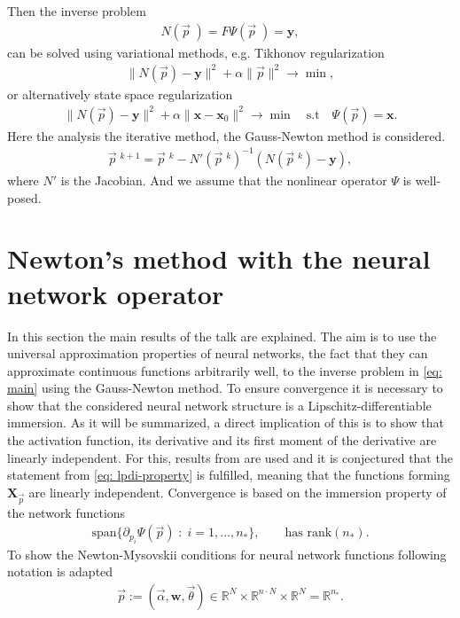 Then the inverse problem
\begin{align}
    N(\vec{p}\;) = F\Psi(\vec{p}\;) = \mathbf{y},
\end{align}
can be solved using variational methods, e.g. Tikhonov regularization
\begin{align}
    \|N(\vec{p}) - \mathbf{y}\|^{2} + \alpha \|\vec{p}\|^{2} \to \min,
\end{align}
or alternatively state space regularization
\begin{align}
    \|N(\vec{p}) - \mathbf{y}\|^{2}
    + \alpha \|\mathbf{x} - \mathbf{x}_0\|^{2}
    \to \min \quad \text{s.t} \quad \Psi(\vec{p}) = \mathbf{x}.
\end{align}
Here the analysis the iterative method, the Gauss-Newton method is
considered.
\begin{align}
    \vec{p}\;^{k+1} = \vec{p}\;^{k} -
    N'( \vec{p}\;^{k})^{-1} (N(\vec{p}\;^{k}) -
    \mathbf{y}  ),
\end{align}
where $N'$ is the Jacobian. And we assume that the nonlinear operator $\Psi$ is well-posed.


\section{Newton's method with the neural network operator}
In this section the main results of the talk are explained. The aim is to use
the universal approximation properties of neural networks, the fact that they
can approximate continuous functions arbitrarily well, to the inverse problem
in \ref{eq: main} using the Gauss-Newton method. To ensure convergence it is
necessary to show that the considered neural network structure is a
Lipschitz-differentiable immersion. As it will be summarized, a direct implication
of this is to show that the activation function, its
derivative and its first moment of the derivative are linearly independent.
For this, results from \cite{lamperski_2022} are used and it is conjectured
that the statement from \ref{eq: lpdi-property} is fulfilled, meaning that
the functions forming $\mathbf{X}_{\vec{p}}$ are linearly independent.
\newline
Convergence is based on the immersion property of the network functions
\begin{align}
    \text{span}\{\partial_{p_i}\Psi(\vec{p})\;:\;i=1,\ldots,n_*\}, \qquad
    \text{has rank}(n_*).
\end{align}
To show the Newton-Mysovskii conditions for neural network functions
following notation is adapted
\begin{align}
    \vec{p} := (\vec{\alpha}, \mathbf{w}, \vec{\theta}) \in
    \mathbb{R}^{N}\times \mathbb{R}^{n\cdot N} \times \mathbb{R}^{N} =
    \mathbb{R}^{n_*}.
\end{align}

